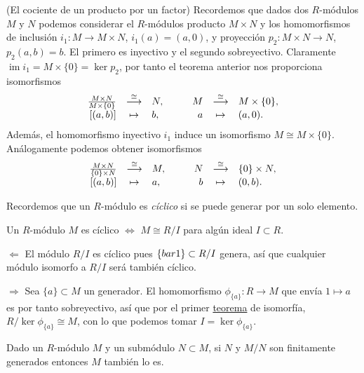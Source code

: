 \textrm{\normalfont (El cociente de un producto por un factor)}
Recordemos que dados dos \(R\)-módulos \(M\) y \(N\) podemos considerar
el \(R\)-módulos producto \(M\times N\) y los homomorfismos de inclusión
\(i_1\colon M\rightarrow M\times N\), \(i_1(a)=(a,0)\), y proyección
\(p_2\colon M\times N\rightarrow N\), \(p_2(a,b)=b\). El primero es
inyectivo y el segundo sobreyectivo. Claramente
\(\operatorname{im}i_1=M\times\{0\}=\ker p_2\), por tanto el teorema
anterior nos proporciona isomorfismos \[\begin{array}{rclrcl}
\frac{M\times N}{M\times\{0\}}&\stackrel{\cong}\longrightarrow&N,&\qquad M&\stackrel{\cong}\longrightarrow&M\times\{0\},\cr 
[(a,b)]&\mapsto& b,&a&\mapsto&(a,0).\end{array}\] Además, el
homomorfismo inyectivo \(i_1\) induce un isomorfismo
\(M\cong M\times\{0\}\). Análogamente podemos obtener isomorfismos
\[\begin{array}{rclrcl}
\frac{M\times N}{\{0\}\times N}&\stackrel{\cong}\longrightarrow&M,&\qquad N&\stackrel{\cong}\longrightarrow&\{0\}\times N,\cr 
[(a,b)]&\mapsto& a,&b&\mapsto&(0,b).\end{array}\] 

Recordemos que un \(R\)-módulo es \emph{cíclico} si se puede generar por
un solo elemento.


Un \(R\)-módulo \(M\) es cíclico \(\Leftrightarrow\) \(M\cong R/I\) para
algún ideal \(I\subset R\). 


\(\Leftarrow\) El módulo \(R/I\) es cíclico pues
\(\{\\bar 1\}\subset R/I\) genera, así que cualquier módulo isomorfo a
\(R/I\) será también cíclico.

\(\Rightarrow\) Sea \(\{a\}\subset M\) un generador. El homomorfismo
\(\phi_{\{a\}}\colon R\rightarrow M\) que envía \(1\mapsto a\) es por
tanto sobreyectivo, así que por el primer
\protect\hyperlink{isomodules}{teorema} de isomorfía,
\(R/\ker \phi_{\{a\}}\cong M\), con lo que podemos tomar
\(I=\ker \phi_{\{a\}}\).\\


Dado un \(R\)-módulo \(M\) y un submódulo \(N\subset M\), si \(N\) y
\(M/N\) son finitamente generados entonces \(M\) también lo es.


